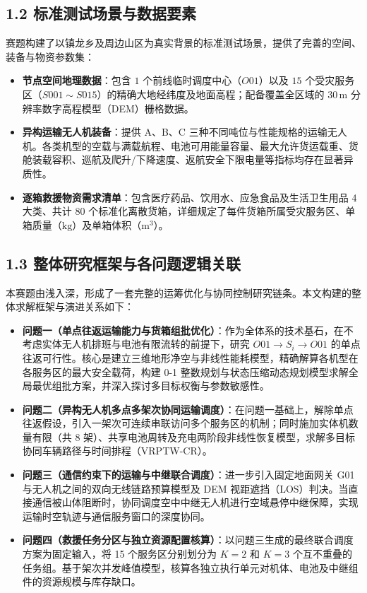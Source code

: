 \documentclass[withoutpreface,bwprint]{format}
\begin{document}
\subsection{1.2 标准测试场景与数据要素}
赛题构建了以镇龙乡及周边山区为真实背景的标准测试场景，提供了完善的空间、装备与物资参数集：
\begin{itemize}[leftmargin=*]
    \item \textbf{节点空间地理数据}：包含 $1$ 个前线临时调度中心（$O01$）以及 $15$ 个受灾服务区（$S001\sim S015$）的精确大地经纬度及地面高程；配备覆盖全区域的 $30\,\text{m}$ 分辨率数字高程模型（DEM）栅格数据。
    \item \textbf{异构运输无人机装备}：提供 A、B、C 三种不同吨位与性能规格的运输无人机。各类机型的空载与满载航程、电池可用能量容量、最大允许货运载重、货舱装载容积、巡航及爬升/下降速度、返航安全下限电量等指标均存在显著异质性。
    \item \textbf{逐箱救援物资需求清单}：包含医疗药品、饮用水、应急食品及生活卫生用品 4 大类、共计 $80$ 个标准化离散货箱，详细规定了每件货箱所属受灾服务区、单箱质量（$\text{kg}$）及单箱体积（$\text{m}^3$）。
\end{itemize}

\subsection{1.3 整体研究框架与各问题逻辑关联}
本赛题由浅入深，形成了一套完整的运筹优化与协同控制研究链条。本文构建的整体求解框架与演进关系如下：
\begin{itemize}[leftmargin=*]
    \item \textbf{问题一（单点往返运输能力与货箱组批优化）}：作为全体系的技术基石，在不考虑实体无人机排班与电池有限流转的前提下，研究 $O01 \to S_i \to O01$ 的单点往返可行性。核心是建立三维地形净空与非线性能耗模型，精确解算各机型在各服务区的最大安全载荷，构建 0-1 整数规划与状态压缩动态规划模型求解全局最优组批方案，并深入探讨多目标权衡与参数敏感性。
    \item \textbf{问题二（异构无人机多点多架次协同运输调度）}：在问题一基础上，解除单点往返假设，引入一架次可连续串联访问多个服务区的机制；同时施加实体机数量有限（共 8 架）、共享电池周转及充电两阶段非线性恢复模型，求解多目标协同车辆路径与时间排程（VRPTW-CR）。
    \item \textbf{问题三（通信约束下的运输与中继联合调度）}：进一步引入固定地面网关 G01 与无人机之间的双向无线链路预算模型及 DEM 视距遮挡（LOS）判决。当直接通信被山体阻断时，协同调度空中中继无人机进行空域悬停中继保障，实现运输时空轨迹与通信服务窗口的深度协同。
    \item \textbf{问题四（救援任务分区与独立资源配置核算）}：以问题三生成的最终联合调度方案为固定输入，将 15 个服务区分别划分为 $K=2$ 和 $K=3$ 个互不重叠的任务组。基于架次并发峰值模型，核算各独立执行单元对机体、电池及中继组件的资源规模与库存缺口。
\end{itemize}
\end{document}
